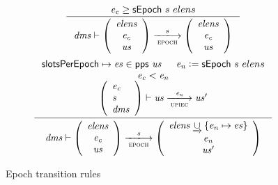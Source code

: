 \documentclass[11pt,a4paper]{article}
\newcommand{\unionoverride}{\mathbin{\underrightarrow\cup}}
\newcommand{\var}[1]{\mathit{#1}}
\newcommand{\fun}[1]{\mathsf{#1}}
\newcommand{\pp}[1]{\mathsf{#1}}
\newcommand{\trans}[2]{\xlongrightarrow[\textsc{#1}]{#2}}
\newcommand{\leteq}{\ensuremath{\mathrel{\mathop:}=}}
\begin{document}
\begin{figure}[ht]
  \begin{equation*}
    \inference
    {
      \var{e_c} \geq \sepoch{s}{elens}
    }
    {\var{dms} \vdash
      {
        \left(
          {\begin{array}{c}
             \var{elens} \\
             \var{e_c} \\
             \var{us}
           \end{array}
         }
       \right)
     }
     \trans{epoch}{s}
     {
       \left(
         {\begin{array}{c}
            \var{elens} \\
            \var{e_c} \\
            \var{us}
          \end{array}
        }
      \right)
    }
  }
\end{equation*}
\vspace{20pt}
\begin{equation*}
  \inference
  {
    \pp{slotsPerEpoch} \mapsto \var{es} \in \fun{pps}~\var{us} & \var{e_n} \leteq \sepoch{s}{elens} \\
    \var{e_c} < \var{e_n}
    \\
    {\left(
        \begin{array}{l}
          \var{\var{e_c}} \\
          \var{s} \\
          \var{dms}
        \end{array}
      \right)
    }
    \vdash \var{us} \trans{upiec}{\var{e_n}} \var{us'}
  }
  {
    \var{dms} \vdash
    {
      \left(
        {\begin{array}{c}
           \var{elens} \\
           \var{e_c} \\
           \var{us}
         \end{array}
       }
     \right)
   }
   \trans{epoch}{\var{s}}
   {
     \left(
       {\begin{array}{c}
          \var{elens} \unionoverride \{\var{e_n} \mapsto \var{es}\}\\
          \var{e_n} \\
          \var{us'}
        \end{array}
      }
    \right)
  }
}
\end{equation*}
\caption{Epoch transition rules}
\label{fig:rules:epoch}
\end{figure}
\end{document}
